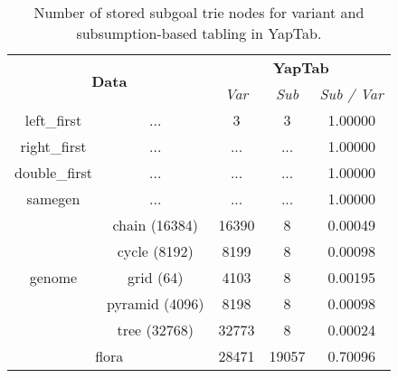 \begin{table}[ht]
\centering
\small{
  \begin{tabular}{cc|ccc}
   \hline
    \hline
    \multicolumn{2}{c|}{\multirow{2}{*}{\normalsize{\textbf{Data}}}} & \multicolumn{3}{c}{\normalsize{\textbf{YapTab}}} \\
     \multicolumn{2}{c|}{} & \textit{\small{Var}} & \textit{\small{Sub}} & \textit{\small{Sub / Var}} \\
   \hline
   \hline

   left\_first &  \footnotesize{...} &  3 & 3 & 1.00000 \\
   \hline
   right\_first &  \footnotesize{...} &  ... & ... &  1.00000 \\
   \hline
double\_first &  \footnotesize{...} &  ... & ... &  1.00000 \\
\hline

samegen & \footnotesize{...} &  ... & ... &  1.00000 \\
\hline
\multirow{5}{*}{genome} &  \footnotesize{chain (16384)} &  16390 & 8 &  0.00049 \\
&  \footnotesize{cycle (8192)} &  8199 & 8 &  0.00098 \\
&  \footnotesize{grid (64)} &  4103 & 8 &  0.00195 \\
&  \footnotesize{pyramid (4096)} &  8198 & 8 &  0.00098 \\
&  \footnotesize{tree (32768)} &  32773 & 8 &  0.00024 \\
\hline

\multicolumn{2}{c|}{flora} & 28471 & 19057 & 0.70096 \\
\hline 
\hline
\end{tabular}
}
\caption{Number of stored subgoal trie nodes for variant and subsumption-based tabling in YapTab.}
\label{tbl:results_detail_space_sub_subgoal}
\end{table}
